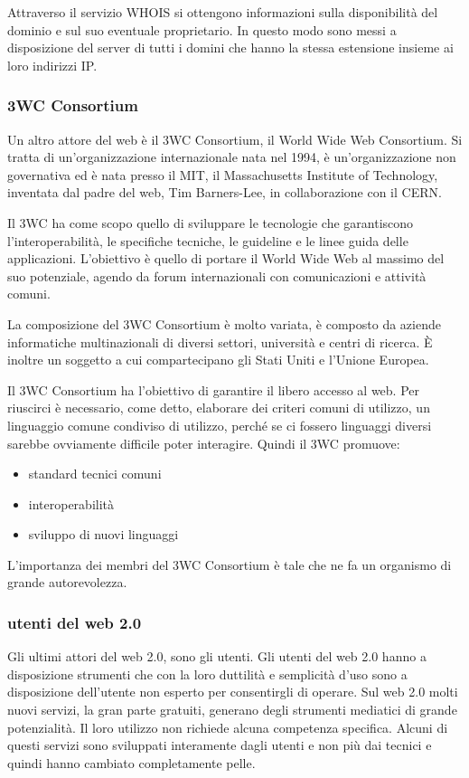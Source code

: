 Attraverso il servizio WHOIS si ottengono informazioni sulla disponibilità del dominio e sul suo eventuale proprietario. In questo modo sono messi a disposizione del server di tutti i domini che hanno la stessa estensione insieme ai loro indirizzi IP.
\subsubsection{3WC Consortium}

Un altro attore del web è il 3WC Consortium, il World Wide Web Consortium. Si tratta di un'organizzazione internazionale nata nel 1994, è un'organizzazione non governativa ed è nata presso il MIT, il Massachusetts Institute of Technology, inventata dal padre del web, Tim Barners-Lee, in collaborazione con il CERN. 

Il 3WC ha come scopo quello di sviluppare le tecnologie che garantiscono l'interoperabilità, le specifiche tecniche, le guideline e le linee guida delle applicazioni. L'obiettivo è quello di portare il World Wide Web al massimo del suo potenziale, agendo da forum internazionali con comunicazioni e attività comuni. 

La composizione del 3WC Consortium è molto variata, è composto da aziende informatiche multinazionali di diversi settori, università e centri di ricerca. È inoltre un soggetto a cui compartecipano gli Stati Uniti e l'Unione Europea. 

Il 3WC Consortium ha l'obiettivo di garantire il libero accesso al web. Per riuscirci è necessario, come detto, elaborare dei criteri comuni di utilizzo, un linguaggio comune condiviso di utilizzo, perché se ci fossero linguaggi diversi sarebbe ovviamente difficile poter interagire. Quindi il 3WC promuove:

\begin{itemize}
    \item standard tecnici comuni
    \item interoperabilità
    \item sviluppo di nuovi linguaggi
\end{itemize}

L'importanza dei membri del 3WC Consortium è tale che ne fa un organismo di grande autorevolezza.

\subsubsection{utenti del web 2.0}
Gli ultimi attori del web 2.0, sono gli utenti.
Gli utenti del web 2.0 hanno a disposizione strumenti che con la loro duttilità e semplicità d'uso sono a disposizione dell'utente non esperto per consentirgli di operare. Sul web 2.0 molti nuovi servizi, la gran parte gratuiti, generano degli strumenti mediatici di grande potenzialità. Il loro utilizzo non richiede alcuna competenza specifica. Alcuni di questi servizi sono sviluppati interamente dagli utenti e non più dai tecnici e quindi hanno cambiato completamente pelle.

